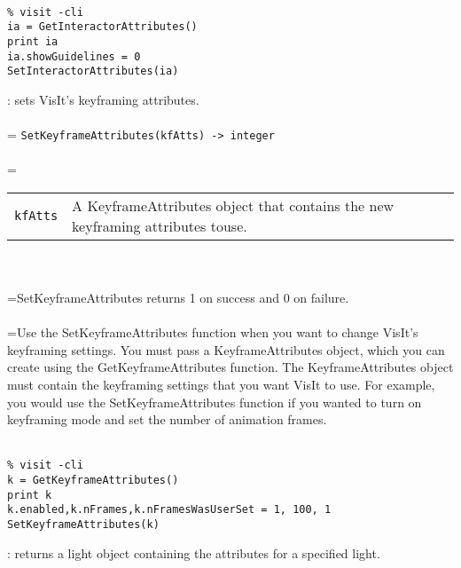 \documentclass[10pt,a4paper]{report}
\begin{document}
\\[-6mm]
\begin{verbatim}% visit -cli
ia = GetInteractorAttributes()
print ia
ia.showGuidelines = 0
SetInteractorAttributes(ia)
\end{verbatim}
\newpage


{}
: sets VisIt's keyframing attributes.\\[-3mm]

 \\ 
\hangindent=\parindent 
\verb!SetKeyframeAttributes(kfAtts) -> integer!\\ [-3mm]

 \\ 
\hangindent=\parindent 
\begin{tabular}{lp{9cm}}
\verb!kfAtts! & A KeyframeAttributes object that contains the new keyframing attributes touse. \\
\end{tabular} \\[-2mm]


 \\ 
\hangindent=\parindent SetKeyframeAttributes returns 1 on success and 0 on failure. \\[-3mm] 

 \\ 
\hangindent=\parindent Use the SetKeyframeAttributes function when you want to change VisIt's keyframing settings. You must pass a KeyframeAttributes object, which you can create using the GetKeyframeAttributes function. The KeyframeAttributes object must contain the keyframing settings that you want VisIt to use. For example, you would use the SetKeyframeAttributes function if you wanted to turn on keyframing mode and set the number of animation frames. \\[-3mm] 

\\[-6mm]
\begin{verbatim}% visit -cli
k = GetKeyframeAttributes()
print k
k.enabled,k.nFrames,k.nFramesWasUserSet = 1, 100, 1
SetKeyframeAttributes(k)
\end{verbatim}
\newpage


{}
: returns a light object containing the attributes for a specified light.\\[-3mm]
\end{document}
